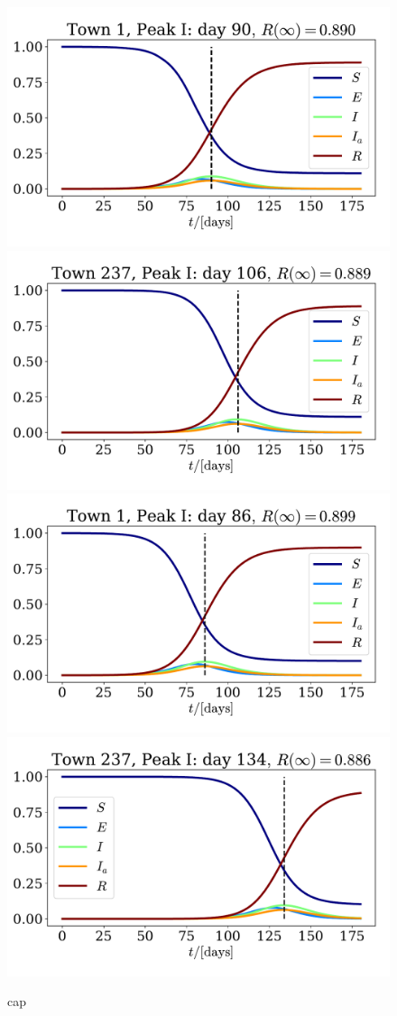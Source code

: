 \documentclass{article}
\begin{document}
    \begin{figure}[H]
        \centering
        \includegraphics[width=.49\textwidth]{../plots/2D/Oslo.pdf}
        \includegraphics[width=.49\textwidth]{../plots/2D/Bergen.pdf}
        \includegraphics[width=.49\textwidth]{../plots/2D/Oslolockdown.pdf}
        \includegraphics[width=.49\textwidth]{../plots/2D/Bergenlockdown.pdf}
        \caption{cap}
        \label{Oslo Bergen}
    \end{figure}
    
    

    \printbibliography
\end{document}
